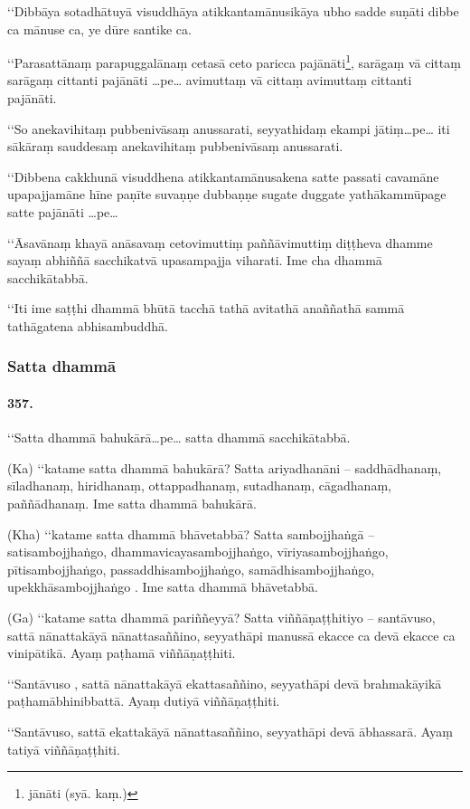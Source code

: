 ‘‘Dibbāya sotadhātuyā visuddhāya atikkantamānusikāya ubho sadde suṇāti dibbe ca mānuse ca, ye dūre santike ca.

‘‘Parasattānaṃ parapuggalānaṃ cetasā ceto paricca pajānāti\footnote{jānāti (syā. kaṃ.)}, sarāgaṃ vā cittaṃ sarāgaṃ cittanti pajānāti …pe… avimuttaṃ vā cittaṃ avimuttaṃ cittanti pajānāti.

‘‘So anekavihitaṃ pubbenivāsaṃ anussarati, seyyathidaṃ ekampi jātiṃ…pe… iti sākāraṃ sauddesaṃ anekavihitaṃ pubbenivāsaṃ anussarati.

‘‘Dibbena cakkhunā visuddhena atikkantamānusakena satte passati cavamāne upapajjamāne hīne paṇīte suvaṇṇe dubbaṇṇe sugate duggate yathākammūpage satte pajānāti …pe…

‘‘Āsavānaṃ khayā anāsavaṃ cetovimuttiṃ paññāvimuttiṃ diṭṭheva dhamme sayaṃ abhiññā sacchikatvā upasampajja viharati. Ime cha dhammā sacchikātabbā.

‘‘Iti ime saṭṭhi dhammā bhūtā tacchā tathā avitathā anaññathā sammā tathāgatena abhisambuddhā.

\subsubsection{Satta dhammā}

\paragraph{357.} ‘‘Satta dhammā bahukārā…pe… satta dhammā sacchikātabbā.

(Ka) ‘‘katame satta dhammā bahukārā? Satta ariyadhanāni – saddhādhanaṃ, sīladhanaṃ, hiridhanaṃ, ottappadhanaṃ, sutadhanaṃ, cāgadhanaṃ, paññādhanaṃ. Ime satta dhammā bahukārā.

(Kha) ‘‘katame satta dhammā bhāvetabbā? Satta sambojjhaṅgā – satisambojjhaṅgo, dhammavicayasambojjhaṅgo, vīriyasambojjhaṅgo, pītisambojjhaṅgo, passaddhisambojjhaṅgo, samādhisambojjhaṅgo, upekkhāsambojjhaṅgo . Ime satta dhammā bhāvetabbā.

(Ga) ‘‘katame satta dhammā pariññeyyā? Satta viññāṇaṭṭhitiyo – santāvuso, sattā nānattakāyā nānattasaññino, seyyathāpi manussā ekacce ca devā ekacce ca vinipātikā. Ayaṃ paṭhamā viññāṇaṭṭhiti.

‘‘Santāvuso , sattā nānattakāyā ekattasaññino, seyyathāpi devā brahmakāyikā paṭhamābhinibbattā. Ayaṃ dutiyā viññāṇaṭṭhiti.

‘‘Santāvuso, sattā ekattakāyā nānattasaññino, seyyathāpi devā ābhassarā. Ayaṃ tatiyā viññāṇaṭṭhiti.

